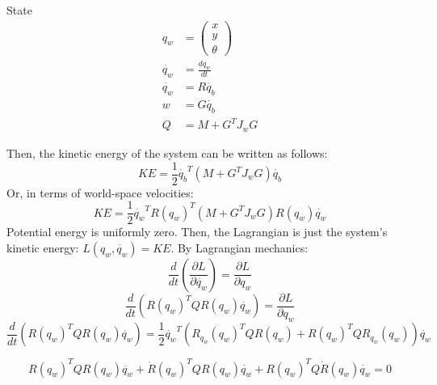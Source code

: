 \documentclass{article}
\begin{document}
\printnomenclature{}

State
\begin{align*}
    q_w &= \begin{pmatrix}
        x \\ y \\ \theta
    \end{pmatrix} \\
    \dot{q_w} &= \frac{dq_w}{dt} \\
    \dot{q_w} &= R\dot{q_b} \\
    w &= G\dot{q_b} \\
    Q &= M + G^TJ_wG
\end{align*}

Then, the kinetic energy of the system can be written as follows:
\[KE = \frac{1}{2}\dot{q_b}^{T}(M + G^{T}J_{w}G)\dot{q_b}\]
Or, in terms of world-space velocities:
\[KE = \frac{1}{2}\dot{q_w}^{T}R{(q_w)}^{T}{(M + G^{T}J_{w}G)}R{(q_w)}\dot{q_w}\]
Potential energy is uniformly zero. Then, the Lagrangian is just the system's kinetic energy: $L(q_w, \dot{q_w}) = KE$. By Lagrangian mechanics:
\[\frac{d}{dt}\left(\frac{\partial L}{\partial \dot{q_w}}\right) = \frac{\partial L}{\partial q_w}\]
\[\frac{d}{dt}\left(R{(q_w)}^{T}QR{(q_w)}\dot{q_w}\right) = \frac{\partial L}{\partial q_w}\]
\[\frac{d}{dt}\left(R{(q_w)}^{T}QR{(q_w)}\dot{q_w}\right) = \frac{1}{2}\dot{q_w}^T\left(
        R_{q_w}{(q_w)}^TQR{(q_w)} + R{(q_w)}^TQR_{q_w}{(q_w)}
    \right)\dot{q_w}\]

\[R{(q_w)}^{T}QR{(q_w)}\ddot{q_w} + \dot{R}(q_w)^TQR(q_w)\dot{q_w} + R(q_w)^TQ\dot{R}(q_w)\dot{q_w} = 0\]
\end{document}
